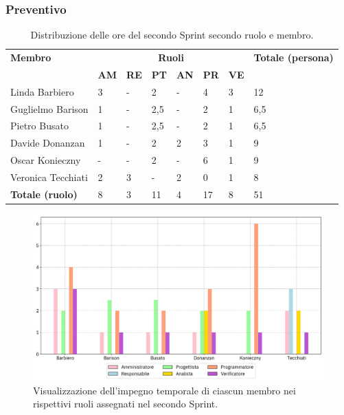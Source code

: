 \subsubsection{Preventivo}
\begin{table}[ht!]
	\centering
	\begin{tabular}{p{4cm} p{1cm} p{1cm} p{1cm} p{1cm} p{1cm} p{1cm} p{3cm}}
        \toprule
        \textbf{Membro} & \multicolumn{6}{c}{\textbf{Ruoli}} & \textbf{Totale (persona)}\\
		& \textbf{AM} & \textbf{RE} & \textbf{PT} & \textbf{AN} & \textbf{PR} & \textbf{VE}\\
		\midrule
        Linda Barbiero          & 3     & -     & 2     & -     & 4     & 3     & 12 \\
        Guglielmo Barison       & 1     & -     & 2,5     & -     & 2   & 1     & 6,5\\
        Pietro Busato           & 1     & -     & 2,5     & -     & 2   & 1     & 6,5 \\
        Davide Donanzan         & 1     & -     & 2     & 2     & 3     & 1   & 9 \\
        Oscar Konieczny         & -     & -     & 2     & -     & 6     & 1     & 9 \\
        Veronica Tecchiati      & 2     & 3     & -     & 2     & 0     & 1     & 8 \\
        \bottomrule
        \textbf{Totale (ruolo)} & 8     & 3     & 11     & 4   & 17     & 8   & 51 \\
	\end{tabular}
	\caption{Distribuzione delle ore del secondo Sprint secondo ruolo e membro.}
	\label{table:Distribuzione delle ore del secondo Sprint secondo ruolo e membro}
\end{table}
\begin{figure}[ht!]
    \centering
    \includegraphics[width=15cm]{./asset/istogramma_periodo_2.png}
    \caption{Visualizzazione dell’impegno temporale di ciascun membro nei rispettivi ruoli assegnati
    nel secondo Sprint.}
    \label{figure:Visualizzazione dell’impegno temporale di ciascun membro nei rispettivi ruoli
    assegnati nel secondo Sprint}
\end{figure}
